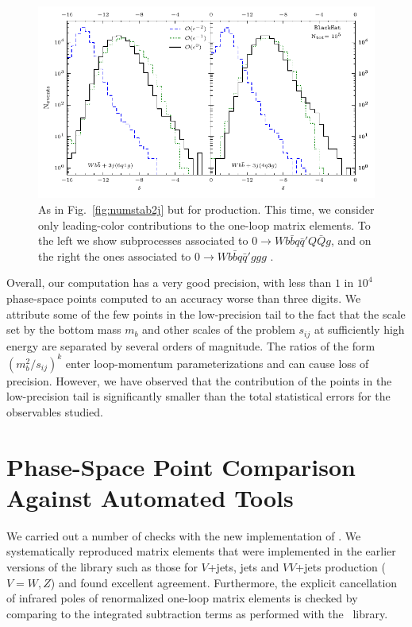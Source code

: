 \begin{figure}[tbh]
\begin{center}
\includegraphics[clip,scale=1.2]{plots/numstab3j}
\end{center}
\caption{As in Fig.~\ref{fig:numstab2j} but for \Wbbnj[3]{}
  production. This time, we consider only leading-color contributions to the one-loop matrix elements.
    To the left we show subprocesses associated to $0\rightarrow Wb{\bar
b}q{\bar q}'Q{\bar Q}g$, and on the right the ones associated to
    $0\rightarrow Wb{\bar b}q{\bar q}'ggg$ .}
\label{fig:numstab3j}
\end{figure}


Overall, our computation has a very good precision, with less than $1$ in $10^4$ phase-space
points computed to an accuracy worse than three digits.
%
We attribute some of the few points in the low-precision tail to the
fact that the scale set by the bottom mass $m_b$ and other scales of
the problem $s_{ij}$ at sufficiently high energy are separated by several orders of magnitude.
The ratios of the form $(m_b^2/s_{ij})^k$ enter loop-momentum
parameterizations and can cause loss of precision. However, we have observed that
the contribution of the points in the low-precision tail is significantly smaller than the total statistical errors for the observables studied.



\section{Phase-Space Point Comparison Against Automated Tools}
\label{sec:pspcomp}
We carried out a number of checks with the new implementation of \BlackHat{}. %
We systematically reproduced matrix elements that were implemented in the earlier versions of the library such as those for $V$+jets, jets and $VV$+jets production ($V=W,Z$) and found
excellent agreement. Furthermore, the explicit cancellation of infrared poles of renormalized one-loop matrix
elements is checked by comparing to the integrated subtraction terms as performed with the~\SHERPA{} library.

